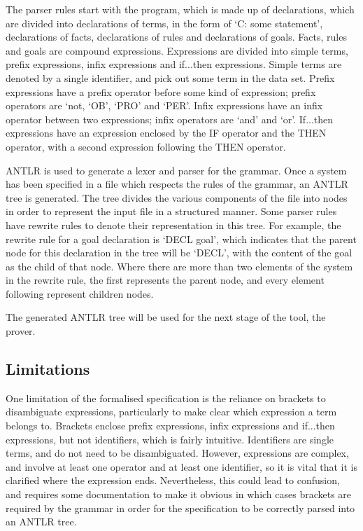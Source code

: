 \documentclass{l4proj}
\begin{document}
The parser rules start with the program, which is made up of declarations, which are divided into declarations of terms, in the form of `C: some statement', declarations of facts, declarations of rules and declarations of goals. Facts, rules and goals are compound expressions. Expressions are divided into simple terms, prefix expressions, infix expressions and if...then expressions. Simple terms are denoted by a single identifier, and pick out some term in the data set. Prefix expressions have a prefix operator before some kind of expression; prefix operators are `not, `OB', `PRO' and `PER'. Infix expressions have an infix operator between two expressions; infix operators are `and' and `or'. If...then expressions have an expression enclosed by the IF operator and the THEN operator, with a second expression following the THEN operator. 

ANTLR is used to generate a lexer and parser for the grammar. Once a system has been specified in a file which respects the rules of the grammar, an ANTLR tree is generated. The tree divides the various components of the file into nodes in order to represent the input file in a structured manner. Some parser rules have rewrite rules to denote their representation in this tree. For example, the rewrite rule for a goal declaration is `DECL goal', which indicates that the parent node for this declaration in the tree will be `DECL', with the content of the goal as the child of that node. Where there are more than two elements of the system in the rewrite rule, the first represents the parent node, and every element following represent children nodes. 

The generated ANTLR tree will be used for the next stage of the tool, the prover. 

\subsection{Limitations}
One limitation of the formalised specification is the reliance on brackets to disambiguate expressions, particularly to make clear which expression a term belongs to. Brackets enclose prefix expressions, infix expressions and if...then expressions, but not identifiers, which is fairly intuitive. Identifiers are single terms, and do not need to be disambiguated. However, expressions are complex, and involve at least one operator and at least one identifier, so it is vital that it is clarified where the expression ends. Nevertheless, this could lead to confusion, and requires some documentation to make it obvious in which cases brackets are required by the grammar in order for the specification to be correctly parsed into an ANTLR tree. 
\end{document}

